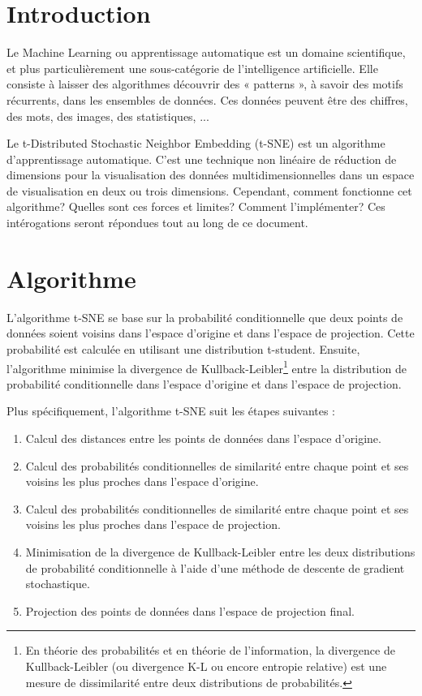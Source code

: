 \documentclass[12pt,a4paper]{article}
\begin{document}
	\newpage
	\section*{Introduction}
	Le Machine Learning ou apprentissage automatique est un domaine scientifique, et plus particulièrement une sous-catégorie de l’intelligence artificielle. Elle consiste à laisser des algorithmes découvrir des  « patterns », à savoir des motifs récurrents, dans les ensembles de données. Ces données peuvent être des chiffres, des mots, des images, des statistiques, ...
	
	Le t-Distributed Stochastic Neighbor Embedding (t-SNE) est un algorithme d'apprentissage automatique. C'est une technique non linéaire de réduction de dimensions pour la visualisation des données multidimensionnelles dans un espace de visualisation en deux ou trois dimensions. Cependant, comment fonctionne cet algorithme? Quelles sont ces forces et limites? Comment l'implémenter? Ces intérogations seront répondues tout au long de ce document.
	
	\newpage
	\section{Algorithme}
	L'algorithme t-SNE se base sur la probabilité conditionnelle que deux points de données soient voisins dans l'espace d'origine et dans l'espace de projection. Cette probabilité est calculée en utilisant une distribution t-student. Ensuite, l'algorithme minimise la divergence de  Kullback-Leibler\footnote{En théorie des probabilités et en théorie de l'information, la divergence de Kullback-Leibler (ou divergence K-L ou encore entropie relative) est une mesure de dissimilarité entre deux distributions de probabilités.} entre la distribution de probabilité conditionnelle dans l'espace d'origine et dans l'espace de projection.
	
	Plus spécifiquement, l'algorithme t-SNE suit les étapes suivantes :
	\begin{enumerate}
		\item Calcul des distances entre les points de données dans l'espace d'origine.
		\item Calcul des probabilités conditionnelles de similarité entre chaque point et ses voisins les plus proches dans l'espace d'origine.
		\item Calcul des probabilités conditionnelles de similarité entre chaque point et ses voisins les plus proches dans l'espace de projection.
		\item Minimisation de la divergence de Kullback-Leibler entre les deux distributions de probabilité conditionnelle à l'aide d'une méthode de descente de gradient stochastique.
		\item Projection des points de données dans l'espace de projection final.
	\end{enumerate}
	
\end{document}
